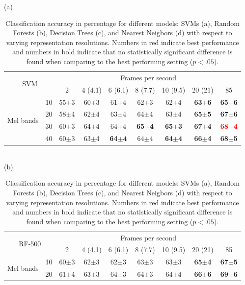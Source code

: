 \documentclass[sensors,article,submit,moreauthors,pdftex,10pt,a4paper]{mdpi}
\begin{document}
\begin{table}[h]
\centering
\caption{Classification accuracy in percentage for different models: SVMs (a), Random Forests (b), Decision Trees (c), and Nearest Neigbors (d) with respect to varying representation resolutions. Numbers in red indicate best performance and numbers in bold indicate that no statistically significant difference is found when comparing to the best performing setting ($p<.05$).}
\label{T1}
(a)\\
\begin{tabular}{ll|c|c|c|c|c|c|c|}
\cline{3-9}
\multicolumn{2}{c}{\multirow{2}{*}{SVM}} & \multicolumn{7}{|c|}{Frames per second}\\ \cline{3-9}
 & & 2 & 4 (4.1) & 6 (6.1) & 8 (7.7) & 10 (9.5) & 20 (21) & 85 \\ \cline{1-9}
\multicolumn{1}{|c}{\multirow{4}{*}{Mel bands}}
 & \multicolumn{1}{|c|}{10} & 55$\pm$3 & 60$\pm$3 & 61$\pm$4 & 62$\pm$3 & 62$\pm$4 & \textbf{63$\pm$6} & \textbf{65$\pm$6} \\ \cline{2-9}
\multicolumn{1}{|c}{}
 & \multicolumn{1}{|c|}{20} & 58$\pm$4 & 62$\pm$4 & 63$\pm$4 & 64$\pm$4 & 63$\pm$4 & \textbf{65$\pm$5} & \textbf{67$\pm$6} \\ \cline{2-9}
\multicolumn{1}{|c}{}
 & \multicolumn{1}{|c|}{30} & 60$\pm$3 & 64$\pm$4 & 64$\pm$4 & \textbf{65$\pm$4} & \textbf{65$\pm$3} & \textbf{67$\pm$4} & \textbf{\textcolor{red}{68$\pm$4}} \\ \cline{2-9}
\multicolumn{1}{|c}{}
 & \multicolumn{1}{|c|}{40} & 60$\pm$3 & 63$\pm$4 & \textbf{64$\pm$4} & 64$\pm$4 & \textbf{64$\pm$4} & \textbf{66$\pm$4} & \textbf{68$\pm$5} \\ \cline{1-9}
\end{tabular}
\\(b)\\
\begin{tabular}{ll|c|c|c|c|c|c|c|}
\cline{3-9}
\multicolumn{2}{c}{\multirow{2}{*}{RF-500}} & \multicolumn{7}{|c|}{Frames per second}\\ \cline{3-9}
 & & 2 & 4 (4.1) & 6 (6.1) & 8 (7.7) & 10 (9.5) & 20 (21) & 85 \\ \cline{1-9}
\multicolumn{1}{|c}{\multirow{4}{*}{Mel bands}}
 & \multicolumn{1}{|c|}{10} & 60$\pm$3 & 62$\pm$3 & 62$\pm$3 & 63$\pm$3 & 63$\pm$3 & \textbf{65$\pm$4} & \textbf{67$\pm$5} \\ \cline{2-9}
\multicolumn{1}{|c}{}
 & \multicolumn{1}{|c|}{20} & 61$\pm$4 & 63$\pm$3 & 64$\pm$3 & 64$\pm$3 & 64$\pm$4 & \textbf{66$\pm$6} & \textbf{69$\pm$6} \\ \cline{2-9}

\end{tabular}
\end{table}
\end{document}
